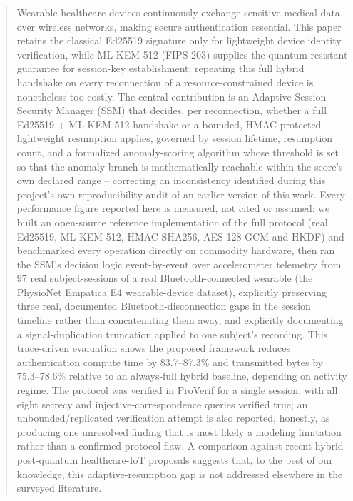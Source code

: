 \documentclass[conference]{IEEEtran}
\begin{document}
\begin{abstract}
Wearable healthcare devices continuously exchange sensitive medical data over
wireless networks, making secure authentication essential. This paper
retains the classical Ed25519 signature only for lightweight device identity
verification, while ML-KEM-512 (FIPS 203) supplies the quantum-resistant
guarantee for session-key establishment; repeating this full hybrid
handshake on every reconnection of a resource-constrained device is
nonetheless too costly. The central contribution is an Adaptive Session
Security Manager (SSM) that decides, per reconnection, whether a full
Ed25519 + ML-KEM-512 handshake or a bounded, HMAC-protected lightweight
resumption applies, governed by session lifetime, resumption count, and a
formalized anomaly-scoring algorithm whose threshold is set so that the
anomaly branch is mathematically reachable within the score's own declared
range -- correcting an inconsistency identified during this project's own
reproducibility audit of an earlier version of this work. Every performance
figure reported here is measured, not cited or assumed: we built an
open-source reference implementation of the full protocol (real Ed25519,
ML-KEM-512, HMAC-SHA256, AES-128-GCM and HKDF) and benchmarked every
operation directly on commodity hardware, then ran the SSM's decision logic
event-by-event over accelerometer telemetry from 97 real subject-sessions of
a real Bluetooth-connected wearable (the PhysioNet Empatica E4
wearable-device dataset), explicitly preserving three real, documented
Bluetooth-disconnection gaps in the session timeline rather than
concatenating them away, and explicitly documenting a signal-duplication
truncation applied to one subject's recording. This trace-driven evaluation
shows the proposed framework reduces authentication compute time by
83.7--87.3\% and transmitted bytes by 75.3--78.6\% relative to an
always-full hybrid baseline, depending on activity regime. The protocol was
verified in ProVerif for a single session, with all eight secrecy and
injective-correspondence queries verified true; an unbounded/replicated
verification attempt is also reported, honestly, as producing one
unresolved finding that is most likely a modeling limitation rather than a
confirmed protocol flaw. A comparison against recent hybrid post-quantum
healthcare-IoT proposals suggests that, to the best of our knowledge, this
adaptive-resumption gap is not addressed elsewhere in the surveyed
literature.
\end{abstract}
\end{document}
